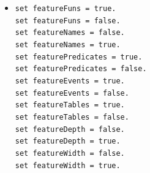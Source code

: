 \documentclass{book}
\begin{document}
\begin{itemize}


\item \lstinline{set featureFuns = true.}\\
\lstinline{set featureFuns = false.}\\[2mm]
\lstinline{set featureNames = false.}\\
\lstinline{set featureNames = true.}\\[2mm]
\lstinline{set featurePredicates = true.}\\
\lstinline{set featurePredicates = false.}\\[2mm]
\lstinline{set featureEvents = true.}\\
\lstinline{set featureEvents = false.}\\[2mm]
\lstinline{set featureTables = true.}\\
\lstinline{set featureTables = false.}\\[2mm]
\lstinline{set featureDepth = false.}\\
\lstinline{set featureDepth = true.}\\[2mm]
\lstinline{set featureWidth = false.}\\
\lstinline{set featureWidth = true.}


\end{itemize}
\end{document}
